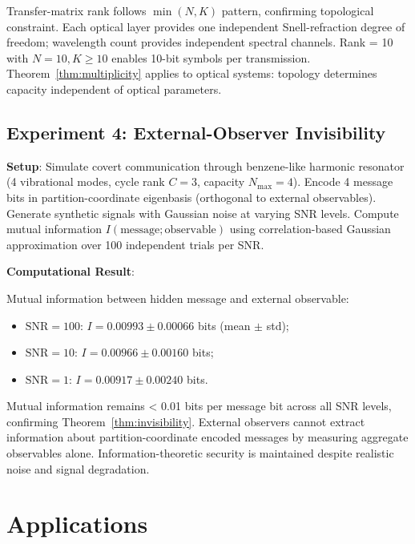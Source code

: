 \documentclass[11pt,twocolumn,a4paper]{article}
\theoremstyle{definition}
\begin{document}
Transfer-matrix rank follows $\min(N, K)$ pattern, confirming topological constraint. Each optical layer provides one independent Snell-refraction degree of freedom; wavelength count provides independent spectral channels. Rank = 10 with $N=10, K \geq 10$ enables 10-bit symbols per transmission. Theorem~\ref{thm:multiplicity} applies to optical systems: topology determines capacity independent of optical parameters.

\subsection{Experiment 4: External-Observer Invisibility}

\textbf{Setup}: Simulate covert communication through benzene-like harmonic resonator (4 vibrational modes, cycle rank $C=3$, capacity $N_{\max}=4$). Encode 4 message bits in partition-coordinate eigenbasis (orthogonal to external observables). Generate synthetic signals with Gaussian noise at varying SNR levels. Compute mutual information $I(\text{message}; \text{observable})$ using correlation-based Gaussian approximation over 100 independent trials per SNR.

\textbf{Computational Result}:

Mutual information between hidden message and external observable:
\begin{itemize}[nosep]
\item $\text{SNR} = 100$: $I = 0.00993 \pm 0.00066$ bits (mean $\pm$ std);
\item $\text{SNR} = 10$: $I = 0.00966 \pm 0.00160$ bits;
\item $\text{SNR} = 1$: $I = 0.00917 \pm 0.00240$ bits.
\end{itemize}

Mutual information remains < 0.01 bits per message bit across all SNR levels, confirming Theorem~\ref{thm:invisibility}. External observers cannot extract information about partition-coordinate encoded messages by measuring aggregate observables alone. Information-theoretic security is maintained despite realistic noise and signal degradation.

\section{Applications}
\label{sec:applications}
\end{document}
